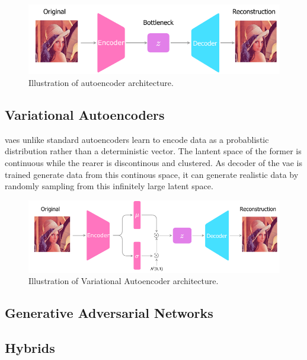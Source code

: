 \begin{figure}[!h]
    \centering
    \includegraphics[scale=1]{figures/ae_arch.pdf}
    \caption{Illustration of autoencoder architecture.}
    \label{fig:ar_arch}
\end{figure}

\subsection{Variational Autoencoders}
\acp{vae} unlike standard autoencoders learn to encode data as a probablistic distribution rather than a deterministic vector. The lantent space of the former is continuous while the rearer is discontinous and clustered. As decoder of the \ac{vae} is trained generate data from this continous space, it can generate realistic data by randomly sampling from this infinitely large latent space. 

\begin{figure}[!h]
    \centering
    \includegraphics[scale=1]{figures/vae_arch.pdf}
    \caption{Illustration of Variational Autoencoder architecture.}
    \label{fig:vae_arch}
\end{figure}

\subsection{Generative Adversarial Networks}


\subsection{Hybrids}

